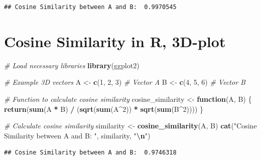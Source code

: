 \documentclass[
  12 pt,
  a4paper,
]{book}
\newenvironment{Shaded}{\begin{snugshade}}{\end{snugshade}}
\newcommand{\CommentTok}[1]{\textcolor[rgb]{0.56,0.35,0.01}{\textit{#1}}}
\newcommand{\ControlFlowTok}[1]{\textcolor[rgb]{0.13,0.29,0.53}{\textbf{#1}}}
\newcommand{\DecValTok}[1]{\textcolor[rgb]{0.00,0.00,0.81}{#1}}
\newcommand{\FunctionTok}[1]{\textcolor[rgb]{0.13,0.29,0.53}{\textbf{#1}}}
\newcommand{\NormalTok}[1]{#1}
\newcommand{\OtherTok}[1]{\textcolor[rgb]{0.56,0.35,0.01}{#1}}
\newcommand{\SpecialCharTok}[1]{\textcolor[rgb]{0.81,0.36,0.00}{\textbf{#1}}}
\newcommand{\StringTok}[1]{\textcolor[rgb]{0.31,0.60,0.02}{#1}}
\numberwithin{equation}{section}
\theoremstyle{plain}      %
\theoremstyle{definition} %
\theoremstyle{remark}     %
\theoremstyle{note}         %
\begin{document}
\begin{verbatim}
## Cosine Similarity between A and B:  0.9970545
\end{verbatim}

\normalsize

\newpage

\hypertarget{cosine-similarity-in-r-3d-plot}{%
\section{Cosine Similarity in R,
3D-plot}\label{cosine-similarity-in-r-3d-plot}}

\scriptsize

\begin{Shaded}
\begin{Highlighting}[]
\CommentTok{\# Load necessary libraries}
\FunctionTok{library}\NormalTok{(ggplot2)}

\CommentTok{\# Example 3D vectors}
\NormalTok{A }\OtherTok{\textless{}{-}} \FunctionTok{c}\NormalTok{(}\DecValTok{1}\NormalTok{, }\DecValTok{2}\NormalTok{, }\DecValTok{3}\NormalTok{)  }\CommentTok{\# Vector A}
\NormalTok{B }\OtherTok{\textless{}{-}} \FunctionTok{c}\NormalTok{(}\DecValTok{4}\NormalTok{, }\DecValTok{5}\NormalTok{, }\DecValTok{6}\NormalTok{)  }\CommentTok{\# Vector B}

\CommentTok{\# Function to calculate cosine similarity}
\NormalTok{cosine\_similarity }\OtherTok{\textless{}{-}} \ControlFlowTok{function}\NormalTok{(A, B) \{}
  \FunctionTok{return}\NormalTok{(}\FunctionTok{sum}\NormalTok{(A }\SpecialCharTok{*}\NormalTok{ B) }\SpecialCharTok{/}\NormalTok{ (}\FunctionTok{sqrt}\NormalTok{(}\FunctionTok{sum}\NormalTok{(A}\SpecialCharTok{\^{}}\DecValTok{2}\NormalTok{)) }\SpecialCharTok{*} \FunctionTok{sqrt}\NormalTok{(}\FunctionTok{sum}\NormalTok{(B}\SpecialCharTok{\^{}}\DecValTok{2}\NormalTok{))))}
\NormalTok{\}}

\CommentTok{\# Calculate cosine similarity}
\NormalTok{similarity }\OtherTok{\textless{}{-}} \FunctionTok{cosine\_similarity}\NormalTok{(A, B)}
\FunctionTok{cat}\NormalTok{(}\StringTok{"Cosine Similarity between A and B: "}\NormalTok{, similarity, }\StringTok{"}\SpecialCharTok{\textbackslash{}n}\StringTok{"}\NormalTok{)}
\end{Highlighting}
\end{Shaded}

\begin{verbatim}
## Cosine Similarity between A and B:  0.9746318
\end{verbatim}
\end{document}
